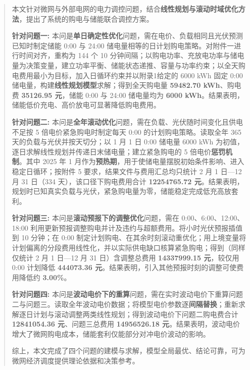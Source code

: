 \begin{abstract}

本文针对微网与外部电网的电力调控问题，结合\textbf{线性规划与滚动时域优化方法}，提出了系统的购电与储能联合调控方案。

\textbf{针对问题一:} 本问是\textbf{单日确定性优化}问题，需在电价、负载相同且光伏预测已知时制定储能 0:00 与 24:00 储电量相等的日计划购电策略。对附件一进行时间对齐，重构为 144 个 10 分钟间隔；以购电功率、充放电功率与储电量为决策变量，建立功率平衡、储能状态递推、容量与功率约束；以全天购电费用最小为目标，加入日循环约束并以附录1给定的 6000 kWh 固定 0:00 储电量，构建\textbf{线性规划模型}求解；得到全天购电量 \textbf{59482.70 kWh}、购电费 \textbf{35126.95 元}，储能 0:00 与 24:00 储电量均为 \textbf{6000 kWh}。结果表明，储能低价充电、高价放电可显著降低购电费用。

\textbf{针对问题二:} 本问是\textbf{全年滚动优化}问题，需在负载、光伏随时间变化且供电不足按 5 倍电价紧急购电时制定每天 0:00 的计划购电策略。读取全年 365 天的负载与光伏并按天切分；以 1 月 1 日 0:00 储电量 6000 kWh 为初值，逐日求解线性规划并传递日末储电量；建立紧急购电的 5 倍电价\textbf{惩罚机制}。其中 2025 年 1 月作为\textbf{预热期}，用于使储电量摆脱初始条件影响、进入稳定日循环；按附件 5 要求，结果文件与费用汇总均只统计 2 月 1 日—12 月 31 日（334 天），该口径下购电费用合计 \textbf{12254765.72 元}。结果表明，规划时已知真实负载与光伏，紧急购电量为零，储能稳定完成低充高放套利。

\textbf{针对问题三:} 本问是\textbf{滚动预报下的调整优化}问题，需在 0:00、6:00、12:00、18:00 利用更新预报调整购电并计及违约与超额费用。将小时光伏预报插值到 10 分钟；在 0:00 制定计划购电、在其余时刻滚动重优化；用上境变量将计划偏离的分段费用线性化，并以实际供电缺口核算紧急购电；得到（同样仅统计 2 月 1 日—12 月 31 日）含调整总费用 \textbf{14337999.15 元}，较仅用 0:00 计划降低 \textbf{444073.36 元}。结果表明，引入其他预报时刻的调整可使费用降低约 \textbf{3.00\%}。

\textbf{针对问题四:} 本问是\textbf{波动电价下的重算}问题，需在实时波动电价下重算问题二与问题三。读取全年波动电价数据；将模型电价参数逐\textbf{间隔替换}；重新求解逐日计划与滚动调整两类线性规划；得到波动电价下问题二购电费合计 \textbf{12841054.36 元}、问题三总费用 \textbf{14956526.18 元}。结果表明，波动电价增大了微网购电成本，储能套利仅能部分对冲电价波动的影响。

综上，本文完成了四个问题的建模与求解，模型全局最优、结论可靠，可为微网经济调度提供理论依据和决策参考。


\end{abstract}
